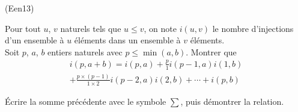 \begin{tiny}(Een13)\end{tiny} Pour tout $u$, $v$ naturels tels que $u\leq v$, on note $i(u,v)$ le nombre d'injections d'un ensemble à $u$ éléments dans un ensemble à $v$ éléments.\\
Soit $p$, $a$, $b$ entiers naturels avec $p\leq \min(a, b)$. Montrer que 
\begin{multline*}
 i(p,a+b) = i(p,a) + \frac{p}{1}i(p-1,a)i(1,b) \\
+ \frac{p\times(p-1)}{1\times 2}i(p-2,a)i(2,b) + \cdots 
+ i(p,b) 
\end{multline*}

\'Ecrire la somme précédente avec le symbole $\sum$, puis démontrer la relation.
